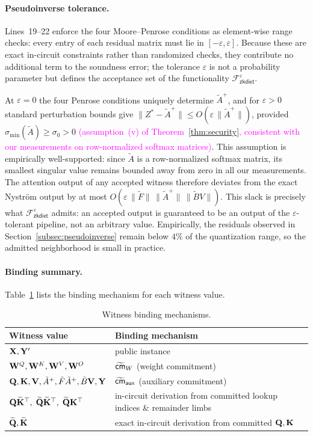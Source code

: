 \documentclass[sigconf,anonymous,review,balance=false]{acmart}
\newcommand{\rev}[1]{{\color{magenta}#1}}
\begin{document}
{\paragraph{Pseudoinverse tolerance.}
Lines~19--22 enforce the four Moore--Penrose conditions as element-wise
range checks: every entry of each residual matrix must lie in
$[-\varepsilon,\varepsilon]$. Because these are exact in-circuit
constraints rather than randomized checks, they contribute no additional
term to the soundness error; the tolerance $\varepsilon$ is not a
probability parameter but defines the acceptance set of the functionality
$\mathcal{F}^{\varepsilon}_{\mathsf{zkdiet}}$.

At $\varepsilon = 0$ the four Penrose conditions uniquely
determine $\tilde{A}^{+}$, and for $\varepsilon > 0$ standard
perturbation bounds \rev{\cite{stewart1990matrix}} give
$\|Z^{*} - \tilde{A}^{+}\| \le O(\varepsilon\,\|\tilde{A}^{+}\|)$,
provided $\sigma_{\min}(\tilde{A}) \geq \sigma_0 > 0$
\textcolor{magenta}{(assumption~(v) of Theorem~\ref{thm:security}, consistent with our measurements on row-normalized softmax matrices)}.
This assumption is empirically well-supported: since $\tilde{A}$ is a
row-normalized softmax matrix, its smallest singular value remains
bounded away from zero in all our measurements.
The attention output of any accepted witness therefore deviates from the exact Nystr\"om
output by at most
$O(\varepsilon\,\|\tilde{F}\|\,\|\tilde{A}^{+}\|\,\|\tilde{B}V\|)$. This
slack is precisely what
$\mathcal{F}^{\varepsilon}_{\mathsf{zkdiet}}$ admits: an accepted output
is guaranteed to be an output of the $\varepsilon$-tolerant pipeline, not
an arbitrary value. Empirically, the residuals observed in
Section~\ref{subsec:pseudoinverse} remain below $4\%$ of the quantization
range, so the admitted neighborhood is small in practice.

\paragraph{Binding summary.}
Table~\ref{tab:binding} lists the binding mechanism for each witness value.

\begin{table}[h]
\centering\small
\caption{Witness binding mechanisms.}\label{tab:binding}
\begin{tabular}{@{} l l @{}}
\toprule
Witness value & Binding mechanism \\
\midrule
${\mathbf{X}}, {\mathbf{Y}}'$ & public instance \\
${\mathbf{W}}^Q, {\mathbf{W}}^K, {\mathbf{W}}^V, {\mathbf{W}}^O$ & $\widetilde{{\sf cm}}_{W}$ (weight commitment) \\
${\mathbf{Q}}, {\mathbf{K}}, {\mathbf{V}}, \tilde{A}^{+}, \tilde{F}\tilde{A}^{+}, \tilde{B}{\mathbf{V}}, {\mathbf{Y}}$ & $\widetilde{{\sf cm}}_{\mathsf{aux}}$ (auxiliary commitment) \\
${\mathbf{Q}}\widetilde{{\mathbf{K}}}^{\top},\;\widetilde{{\mathbf{Q}}}\widetilde{{\mathbf{K}}}^{\top},\;\widetilde{{\mathbf{Q}}}{\mathbf{K}}^{\top}$ & \rev{in-circuit derivation from committed lookup indices \& remainder limbs} \\
$\widetilde{{\mathbf{Q}}}, \widetilde{{\mathbf{K}}}$ & exact in-circuit derivation from committed ${\mathbf{Q}}, {\mathbf{K}}$ \\
\bottomrule
\end{tabular}
\end{table}

}
\end{document}
